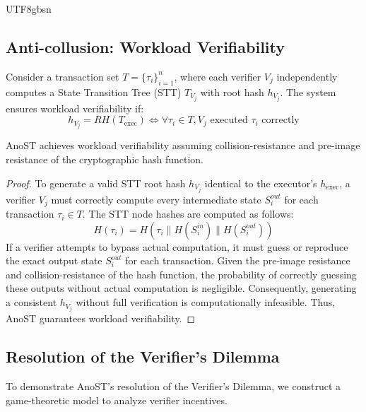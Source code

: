 \documentclass[runningheads]{llncs}
\begin{document}
\begin{CJK*}{UTF8}{gbsn}
\subsection{Anti-collusion: Workload Verifiability}
\begin{definition}
Consider a transaction set $T = \{\tau_i\}_{i=1}^{n}$, where each verifier $V_j$ independently computes a State Transition Tree (STT) $T_{V_j}$ with root hash $h_{V_j}$. The system ensures workload verifiability if:
\[
h_{V_j} = RH(T_{\text{exec}}) \iff \forall \tau_i \in T, V_j \text{ executed } \tau_i \text{ correctly}
\]
\end{definition}

\begin{theorem}
AnoST achieves workload verifiability assuming collision-resistance and pre-image resistance of the cryptographic hash function.
\end{theorem}

\begin{proof}
To generate a valid STT root hash $h_{V_j}$ identical to the executor's $h_{\text{exec}}$, a verifier $V_j$ must correctly compute every intermediate state $S_i^{out}$ for each transaction $\tau_i \in T$. The STT node hashes are computed as follows:
\[
H(\tau_i) = H(\tau_i \| H(S_i^{in}) \| H(S_i^{out}))
\]
If a verifier attempts to bypass actual computation, it must guess or reproduce the exact output state $S_i^{out}$ for each transaction. Given the pre-image resistance and collision-resistance of the hash function, the probability of correctly guessing these outputs without actual computation is negligible. Consequently, generating a consistent $h_{V_j}$ without full verification is computationally infeasible. Thus, AnoST guarantees workload verifiability.
\end{proof}

\subsection{Resolution of the Verifier's Dilemma}
To demonstrate AnoST's resolution of the Verifier's Dilemma, we construct a game-theoretic model to analyze verifier incentives.


\end{CJK*}
\end{document}
